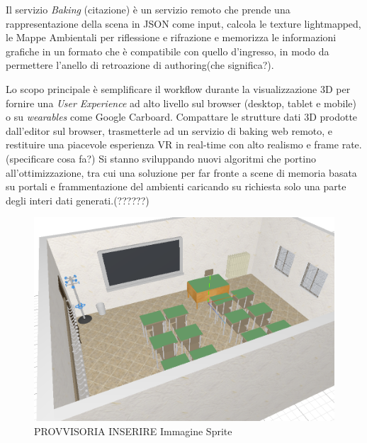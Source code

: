 Il servizio \emph{Baking} (citazione) \`e un servizio remoto che prende una rappresentazione della scena in JSON come input,
calcola le texture lightmapped, le Mappe Ambientali per riflessione e rifrazione e memorizza le informazioni grafiche
in un formato che \`e compatibile con quello d'ingresso, in modo da permettere l'anello di retroazione di authoring(che significa?).


Lo scopo principale \`e semplificare il workflow durante la visualizzazione 3D per fornire una \emph{User Experience}
ad alto livello sul browser (desktop, tablet e mobile) o su \emph{wearables} come Google Carboard.
Compattare le strutture dati 3D prodotte dall'editor sul browser, trasmetterle ad un servizio di baking web remoto,
e restituire una piacevole esperienza VR in real-time con alto realismo e frame rate. (specificare cosa fa?)
Si stanno sviluppando nuovi algoritmi che portino all'ottimizzazione,
tra cui una soluzione per far fronte a scene di memoria basata su portali e frammentazione del ambienti caricando
su richiesta solo una parte degli interi dati generati.(??????)

\begin{figure}[htbp] %
   \centering
   \includegraphics[width=1\linewidth]{images/3d-school-2}
   \caption{PROVVISORIA INSERIRE Immagine Sprite}
   \label{fig:revit}
   \end{figure}
\newpage

